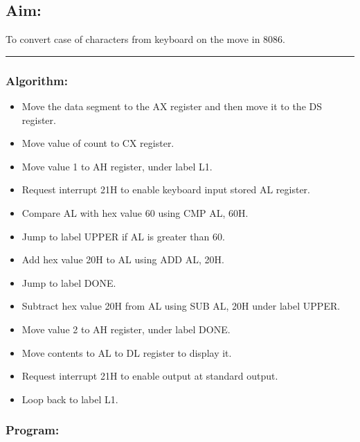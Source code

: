 \documentclass[12pt,a4paper]{article}
\begin{document}
\begin{flushleft}
\subsection*{\textbf{Aim:}} 
To convert case of characters from keyboard on the move in 8086.

\vspace{1cm}
\hrule

\subsubsection*{\textbf{Algorithm:}}
\begin{itemize}
    \item Move the data segment to the AX register and then move it to the DS register.
    \item Move value of count to CX register.
    \item Move value 1 to AH register, under label L1.
    \item Request interrupt 21H to enable keyboard input stored AL register. 
    \item Compare AL with hex value 60 using CMP AL, 60H. 
    \item Jump to label UPPER if AL is greater than 60.
    \item Add hex value 20H to AL using ADD AL, 20H.
    \item Jump to label DONE.
    \item Subtract hex value 20H from AL using SUB AL, 20H under label UPPER.
    \item Move value 2 to AH register, under label DONE.
    \item Move contents to AL to DL register to display it.
    \item Request interrupt 21H to enable output at standard output.
    \item Loop back to label L1.
\end{itemize}

\newpage
\subsubsection*{\textbf{Program:}}


\end{flushleft}
\end{document}
